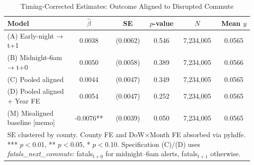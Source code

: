 \begin{table}[htbp]\centering
\caption{Timing-Corrected Estimates: Outcome Aligned to Disrupted Commute}
\begin{tabular}{lccccc}
\hline\hline
Model & $\hat\beta$ & SE & $p$-value & $N$ & Mean $y$ \\
\midrule
(A) Early-night → t+1 & 0.0038 & (0.0062) & 0.546 & 7,234,005 & 0.0565 \\
(B) Midnight-6am → t+0 & 0.0050 & (0.0058) & 0.389 & 7,234,005 & 0.0566 \\
(C) Pooled aligned & 0.0044 & (0.0047) & 0.349 & 7,234,005 & 0.0565 \\
(D) Pooled aligned + Year FE & 0.0054 & (0.0047) & 0.252 & 7,234,005 & 0.0565 \\
(M) Misaligned baseline [memo] & -0.0076** & (0.0039) & 0.050 & 7,234,005 & 0.0565 \\
\hline\hline
\multicolumn{6}{p{0.9\textwidth}}{\footnotesize SE clustered by county. County FE and DoW$\times$Month FE absorbed via pyhdfe. *** $p{<}$0.01, ** $p{<}$0.05, * $p{<}$0.10. Specification (C)/(D) uses \textit{fatals\_next\_commute}: fatals$_{t+0}$ for midnight--6am alerts, fatals$_{t+1}$ otherwise.} \\
\end{tabular}
\end{table}